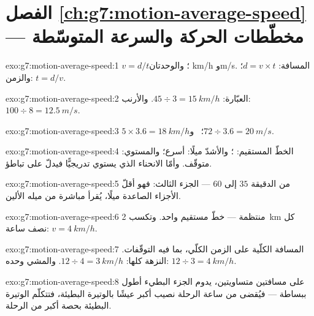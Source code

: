\section*{الفصل \ref{ch:g7:motion-average-speed} --- مخطّطات الحركة والسرعة المتوسّطة}

\begin{solution}{exo:g7:motion-average-speed:1}
$v = d/t$؛ والوحدتان \unit{km/h} و\unit{m/s}. المسافة:
$d = v \times t$؛ والزمن: $t = d/v$.
\end{solution}

\begin{solution}{exo:g7:motion-average-speed:2}
العبّارة: $45 \div 3 = \qty{15}{km/h}$. والأرنب: $100 \div 8 =
\qty{12.5}{m/s}$.
\end{solution}

\begin{solution}{exo:g7:motion-average-speed:3}
$5 \times 3.6 = \qty{18}{km/h}$؛ \ و$72 \div 3.6 = \qty{20}{m/s}$.
\end{solution}

\begin{solution}{exo:g7:motion-average-speed:4}
الخطّ المستقيم: ؛ والأشدّ ميلًا: أسرع؛ والمستوي:
متوقّف. وأمّا الانحناء الذي يستوي تدريجيًّا فيدلّ على تباطؤ.
\end{solution}

\begin{solution}{exo:g7:motion-average-speed:5}
من الدقيقة $35$ إلى $60$ --- الجزء الثالث: فهو أقلّ الأجزاء
الصاعدة ميلًا، يُقرأ مباشرة من ميله الألين.
\end{solution}

\begin{solution}{exo:g7:motion-average-speed:6}
منتظمة --- خطّ مستقيم واحد. وتكسب \qty{2}{km} كل نصف ساعة:
$v = \qty{4}{km/h}$.
\end{solution}

\begin{solution}{exo:g7:motion-average-speed:7}
المسافة الكلّية على الزمن الكلّي، بما فيه التوقّفات. النزهة
كلها: $12 \div 4 = \qty{3}{km/h}$. والمشي وحده: $12 \div 3 =
\qty{4}{km/h}$.
\end{solution}

\begin{solution}{exo:g7:motion-average-speed:8}
على مسافتين متساويتين، يدوم الجزء البطيء أطول ببساطة --- فيُقضى
من ساعة الرحلة نصيب أكبر عيشًا بالوتيرة البطيئة، فتتكلّم
الوتيرة البطيئة بحصة أكبر من  الرحلة.
\end{solution}

